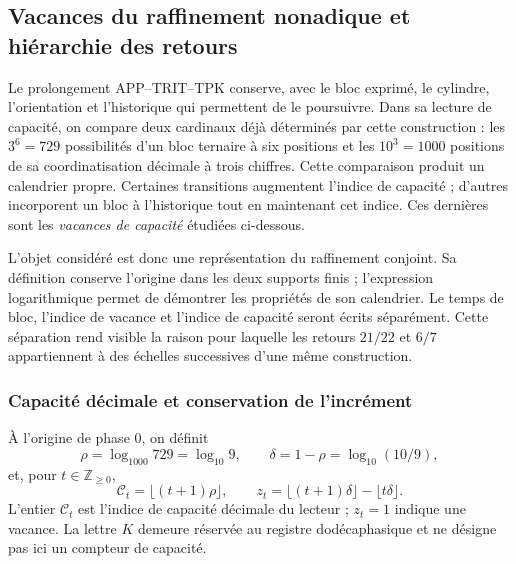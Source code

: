 \subsection{Vacances du raffinement nonadique et hiérarchie des retours}
\label{vac-add-seccion}

Le prolongement APP--TRIT--TPK conserve, avec le bloc exprimé, le cylindre, l'orientation et l'historique qui permettent de le poursuivre. Dans sa lecture de capacité, on compare deux cardinaux déjà déterminés par cette construction : les \(3^6=729\) possibilités d'un bloc ternaire à six positions et les \(10^3=1000\) positions de sa coordinatisation décimale à trois chiffres. Cette comparaison produit un calendrier propre. Certaines transitions augmentent l'indice de capacité ; d'autres incorporent un bloc à l'historique tout en maintenant cet indice. Ces dernières sont les \emph{vacances de capacité} étudiées ci-dessous.

L'objet considéré est donc une représentation du raffinement conjoint. Sa définition conserve l'origine dans les deux supports finis ; l'expression logarithmique permet de démontrer les propriétés de son calendrier. Le temps de bloc, l'indice de vacance et l'indice de capacité seront écrits séparément. Cette séparation rend visible la raison pour laquelle les retours \(21/22\) et \(6/7\) appartiennent à des échelles successives d'une même construction.

\subsubsection{Capacité décimale et conservation de l'incrément}
\label{vac-add-capacidad}

\begin{definition}
\label{vac-add-definicion}
À l'origine de phase \(0\), on définit
\begin{equation}
 \rho=\log_{1000}729=\log_{10}9,
 \qquad \delta=1-\rho=\log_{10}(10/9),
 \label{vac-add-densidad}
\end{equation}
et, pour \(t\in\mathbb Z_{\geq0}\),
\begin{equation}
 \mathcal C_t=\lfloor(t+1)\rho\rfloor,
 \qquad
 z_t=\lfloor(t+1)\delta\rfloor-\lfloor t\delta\rfloor.
 \label{vac-add-indices}
\end{equation}
L'entier \(\mathcal C_t\) est l'indice de capacité décimale du lecteur ;
\(z_t=1\) indique une vacance. La lettre \(K\) demeure réservée au
registre dodécaphasique et ne désigne pas ici un compteur de capacité.
\end{definition}

